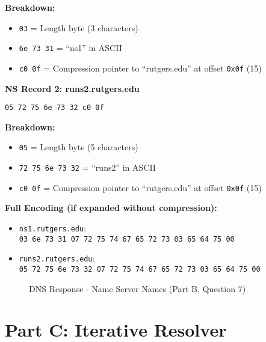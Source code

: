 \documentclass[11pt,letterpaper]{article}
\begin{document}
\textbf{Breakdown:}
\begin{itemize}
    \item \texttt{03} = Length byte (3 characters)
    \item \texttt{6e 73 31} = ``ns1'' in ASCII
    \item \texttt{c0 0f} = Compression pointer to ``rutgers.edu'' at offset \texttt{0x0f} (15)
\end{itemize}

\vspace{0.5cm}

\textbf{NS Record 2: runs2.rutgers.edu}
\begin{hexbox}
\begin{lstlisting}[style=hexstyle]
05 72 75 6e 73 32 c0 0f
\end{lstlisting}
\end{hexbox}

\textbf{Breakdown:}
\begin{itemize}
    \item \texttt{05} = Length byte (5 characters)
    \item \texttt{72 75 6e 73 32} = ``runs2'' in ASCII
    \item \texttt{c0 0f} = Compression pointer to ``rutgers.edu'' at offset \texttt{0x0f} (15)
\end{itemize}

\textbf{Full Encoding (if expanded without compression):}
\begin{itemize}
    \item \texttt{ns1.rutgers.edu}: \\
    \texttt{03 6e 73 31 07 72 75 74 67 65 72 73 03 65 64 75 00}
    \item \texttt{runs2.rutgers.edu}: \\
    \texttt{05 72 75 6e 73 32 07 72 75 74 67 65 72 73 03 65 64 75 00}
\end{itemize}

\begin{figure}[h]
    \centering
    \caption{DNS Response - Name Server Names (Part B, Question 7)}
    \label{fig:partb_q7}
\end{figure}

\newpage

\section{Part C: Iterative Resolver}
\end{document}
